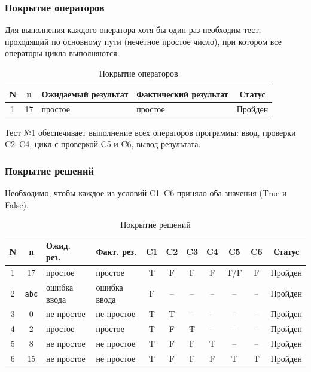 \documentclass{article}[14pt]
\begin{document}
\subsubsection{Покрытие операторов}

Для выполнения каждого оператора хотя бы один раз необходим тест, проходящий по основному пути
(нечётное простое число), при котором все операторы цикла выполняются.

\begin{table}[H]
\centering
\caption{Покрытие операторов}
\begin{tabularx}{\textwidth}{|c|c|X|X|c|}
\hline
\textbf{N} & \textbf{n} & \textbf{Ожидаемый результат} & \textbf{Фактический результат} & \textbf{Статус} \\
\hline
1 & 17 & простое & простое & Пройден \\
\hline
\end{tabularx}
\end{table}

Тест №1 обеспечивает выполнение всех операторов программы: ввод, проверки C2--C4, цикл с проверкой C5 и C6, вывод результата.

\subsubsection{Покрытие решений}

Необходимо, чтобы каждое из условий C1--C6 приняло оба значения (True и False).

\begin{table}[H]
\centering
\caption{Покрытие решений}
\begin{tabularx}{\textwidth}{|c|c|X|X|c|c|c|c|c|c|c|}
\hline
\textbf{N} & \textbf{n} & \textbf{Ожид. рез.} & \textbf{Факт. рез.} & \textbf{C1} & \textbf{C2} & \textbf{C3} & \textbf{C4} & \textbf{C5} & \textbf{C6} & \textbf{Статус} \\
\hline
1 & 17 & простое & простое & T & F & F & F & T/F & F & Пройден \\
\hline
2 & \texttt{abc} & ошибка ввода & ошибка ввода & F & -- & -- & -- & -- & -- & Пройден \\
\hline
3 & 0 & не простое & не простое & T & T & -- & -- & -- & -- & Пройден \\
\hline
4 & 2 & простое & простое & T & F & T & -- & -- & -- & Пройден \\
\hline
5 & 8 & не простое & не простое & T & F & F & T & -- & -- & Пройден \\
\hline
6 & 15 & не простое & не простое & T & F & F & F & T & T & Пройден \\
\hline
\end{tabularx}
\end{table}
\end{document}
